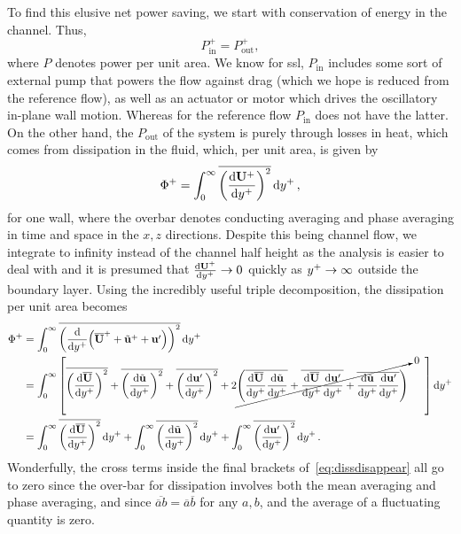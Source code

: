 To find this elusive net power saving, we start with conservation of energy in the channel. Thus,
\begin{equation}
	P_\text{in}^{+}=P_\text{out}^{+}
,\end{equation}
where $P$ denotes power per unit area. We know for \gls{ssl}, $P_\text{in} $ includes some sort of external pump that powers the flow against drag (which we hope is reduced from the reference flow), as well as an actuator or motor which drives the oscillatory in-plane wall motion. Whereas for the reference flow $P_\text{in} $ does not have the latter. On the other hand, the $P_\text{out} $ of the system is purely through losses in heat, which comes from dissipation in the fluid, which, per unit area, is given by
\begin{equation}
	\Phi ^{+}=\int_{0}^{\infty} \overline{\left( \dv{\mathbf{U} \ensuremath{^{+}}}{y\ensuremath{^{+}}}  \right) ^2}  \dd{y\ensuremath{^{+}}} 
,\end{equation}
for one wall, where the overbar denotes conducting averaging and phase averaging in time and space in the $x,z$ directions. Despite this being channel flow, we integrate to infinity instead of the channel half height as the analysis is easier to deal with and it is presumed that $\dv{\mathbf{U}\ensuremath{^{+}}}{y\ensuremath{^{+}}} \to0$ quickly as $y^{+}\to\infty$ outside the boundary layer. Using the incredibly useful triple decomposition, the dissipation per unit area becomes
\begin{align}
	\Phi ^{+}&=\int_{0}^{\infty} \overline{\left( \dv{y\ensuremath{^{+}}}(\overline{\mathbf{U}} ^{+} + \tilde{\mathbf{u} }^{+} + \mathbf{u'} )  \right) ^2}  \dd{y\ensuremath{^{+}}}\\ 
		 &=\int_{0}^{\infty} \left[ \overline{\left( \dv{\overline{\mathbf{U} }}{y\ensuremath{^{+}}}  \right) ^2}+\overline{\left( \dv{\tilde{\mathbf{u} }}{y\ensuremath{^{+}}}  \right) ^2} + \overline{\left(\dv{\mathbf{u'} }{y\ensuremath{^{+}}}\right) ^2} + 2\cancelto{0}{\left( \overline{\dv{ \overline{\mathbf{U} }}{y\ensuremath{^{+}}}\dv{ \tilde{\mathbf{u} }}{y\ensuremath{^{+}}} } + \overline{\dv{ \overline{\mathbf{U} }}{y\ensuremath{^{+}}}\dv{\mathbf{u'} }{y\ensuremath{^{+}}} } + \overline{\dv{ \tilde{\mathbf{u} }}{y\ensuremath{^{+}}}\dv{\mathbf{u'}}{y\ensuremath{^{+}}} } \right)}\phantom{--} \right] \dd{y\ensuremath{^{+}}} \label{eq:dissdisappear}  \\
		 &=\int_{0}^{\infty}  \overline{\left( \dv{\overline{\mathbf{U} }}{y\ensuremath{^{+}}}  \right) ^2}\dd{y\ensuremath{^{+}}}+\int_{0}^{\infty}  \overline{\left( \dv{\tilde{\mathbf{u} }}{y\ensuremath{^{+}}}  \right) ^2} \dd{y\ensuremath{^{+}}} + \int_{0}^{\infty}  \overline{\left(\dv{\mathbf{u'} }{y\ensuremath{^{+}}}\right) ^2} \dd{y\ensuremath{^{+}}}
.\end{align}
Wonderfully, the cross terms inside the final brackets of~\ref{eq:dissdisappear} all go to zero since the over-bar for dissipation involves both the mean averaging and phase averaging, and since $\overline{\overline{a}b}=\overline{a}\overline{b}$ for any $a,b$, and the average of a fluctuating quantity is zero.
